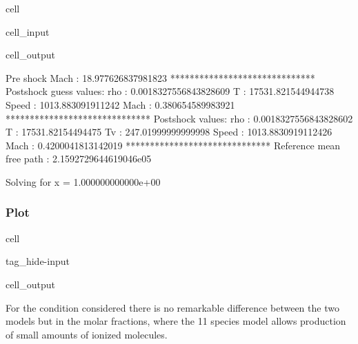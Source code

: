 \documentclass[letterpaper,10pt,english]{jupyterBook}
\begin{document}
\begin{sphinxuseclass}{cell}\begin{sphinxVerbatimInput}

\begin{sphinxuseclass}{cell_input}
\begin{sphinxVerbatim}[commandchars=\\\{\}]
\end{sphinxVerbatim}

\end{sphinxuseclass}\end{sphinxVerbatimInput}
\begin{sphinxVerbatimOutput}

\begin{sphinxuseclass}{cell_output}
\begin{sphinxVerbatim}[commandchars=\\\{\}]
Pre shock Mach : 18.977626837981823
******************************
Post\PYGZhy{}shock guess values:
rho    : 0.0018327556843828609
T      : 17531.821544944738
Speed  : 1013.883091911242
Mach   : 0.380654589983921
******************************
Post\PYGZhy{}shock values:
rho    : 0.0018327556843828602
T      : 17531.82154494475
Tv     : 247.01999999999998
Speed  : 1013.8830919112426
Mach   : 0.4200041813142019
******************************
Reference mean free path : 2.1592729644619046e\PYGZhy{}05

Solving for x = 1.000000000000e+00
\end{sphinxVerbatim}

\end{sphinxuseclass}\end{sphinxVerbatimOutput}

\end{sphinxuseclass}

\subsubsection{Plot}
\label{\detokenize{Results/Results:id2}}
\begin{sphinxuseclass}{cell}
\begin{sphinxuseclass}{tag_hide-input}\begin{sphinxVerbatimOutput}

\begin{sphinxuseclass}{cell_output}
\noindent{}

\end{sphinxuseclass}\end{sphinxVerbatimOutput}

\end{sphinxuseclass}
\end{sphinxuseclass}
\sphinxAtStartPar
For the condition considered there is no remarkable difference between the two models but in the molar fractions, where the 11 species model allows production of small amounts of ionized molecules.
\end{document}
